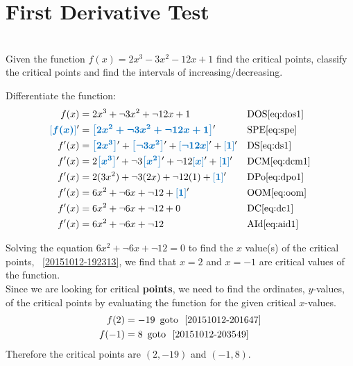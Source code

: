 \documentclass[20150903-160354-rs2.2-MarksMathNotebook.tex]{subfiles}
\begin{document}
%
%

\chapter{First Derivative Test}

\begin{example}[id:20151012-190708] \label{20151012-190708} \hfill \\

Given the function $f(x)=2x^3-3x^2-12x+1$ find the critical points, classify the critical points and find the intervals of increasing/decreasing. 
\soln

\solnsteps

Differentiate the function:
\begin{align*}
f(x) &= 2x^3+\neg 3x^2+\neg12x+1 && \text{DOS} \eqref{eq:dos1} \\
\farg{f(x)}' &= \farg{2x^2+\neg 3x^2 + \neg 12x+1}' && \text{SPE} \eqref{eq:spe} \\
f'(x) &= \farg{2x^3}' + \farg{\neg 3x^2}' + \farg{\neg 12x}' + \farg{1}' && \text{DS} \eqref{eq:ds1} \\
f'(x) &= 2\farg{x^3}' + \neg 3 \farg{x^2}' + \neg 12 \farg{x}' + \farg{1}' && \text{DCM} \eqref{eq:dcm1} \\
f'(x) &= 2(3x^2) + \neg 3 (2x) + \neg 12 (1) + \farg{1}' && \text{DPo} \eqref{eq:dpo1} \\
f'(x) &= 6x^2+\neg 6x + \neg 12 + \farg{1}' && \text{OOM} \eqref{eq:oom} \\
f'(x) &= 6x^2+\neg 6x + \neg 12 + 0 && \text{DC} \eqref{eq:dc1} \\
f'(x) &= 6x^2+\neg 6x + \neg 12 && \text{AId} \eqref{eq:aid1} 
\end{align*}

Solving the equation $6x^2 + \neg 6x + \neg 12=0$ to find the $x$ value(s) of the critical points,  \, \ref{20151012-192313}, we find that $x=2$ and $x=-1$ are critical values of the function.\\

Since we are looking for critical \textbf{points}, we need to find the ordinates, $y$-values, of the critical points by evaluating the function for the given critical $x$-values.
\begin{align*}
f(2) & = -19 \text{\, goto \,} \, \ref{20151012-201647}\\
f(-1) &= 8 \text{\, goto \,} \, \ref{20151012-203549}
\end{align*}
Therefore the critical points are $(2, -19)$ and $(-1, 8)$.\\


\end{example}
\end{document}
